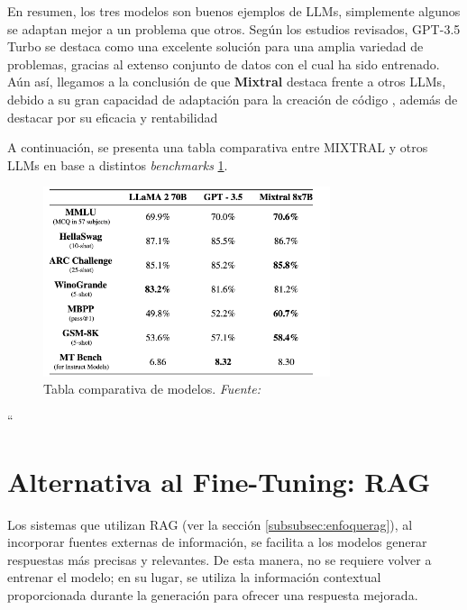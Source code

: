 \bigskip %

En resumen, los tres modelos son buenos ejemplos de \acrshort{LLMs}, simplemente algunos se adaptan mejor a un problema que otros. Según los estudios revisados, \acrshort{GPT}-3.5 Turbo se destaca como una excelente solución para una amplia variedad de problemas, gracias al extenso conjunto de datos con el cual ha sido entrenado. Aún así, llegamos a la conclusión de que \textbf{Mixtral} destaca frente a otros \acrshort{LLMs}, debido a su gran capacidad de adaptación para la creación de código \cite{MixtralWebOficial}, además de destacar por su eficacia y rentabilidad

\bigskip %

A continuación, se presenta una tabla comparativa entre MIXTRAL y otros \acrshort{LLMs} en base a distintos \textit{benchmarks} \ref{fig:5_TablaComparativa}.

\bigskip %

\begin{figure}[htbp!]
  \centering
  \includegraphics[width=0.75\textwidth,keepaspectratio]{imaxes/5_TablaComparativa.png}
  \caption[Tabla comparativa de modelos]{Tabla comparativa de modelos. \textit{Fuente: \cite{MixtralWebOficial}}}
  \label{fig:5_TablaComparativa}
\end{figure}
``

\section{Alternativa al Fine-Tuning: RAG}

Los sistemas que utilizan \acrshort{RAG} (ver la sección \ref{subsubsec:enfoquerag}), al incorporar fuentes externas de información, se facilita a los modelos generar respuestas más precisas y relevantes. De esta manera, no se requiere volver a entrenar el modelo; en su lugar, se utiliza la información contextual proporcionada durante la generación para ofrecer una respuesta mejorada.

